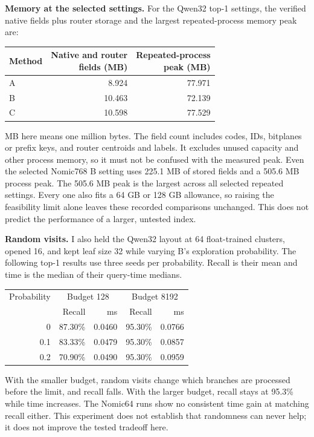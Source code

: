 \textbf{Memory at the selected settings.}
For the Qwen32 top-1 settings, the verified native fields plus router storage and the largest repeated-process memory peak are:

\begin{center}\small
\begin{tabular}{@{}lrr@{}}\toprule
Method & \shortstack{Native and router\\fields (MB)} & \shortstack{Repeated-process\\peak (MB)}\\\midrule
A & 8.924 & 77.971\\
B & 10.463 & 72.139\\
C & 10.598 & 77.529\\\bottomrule
\end{tabular}
\end{center}
MB here means one million bytes. The field count includes codes, IDs, bitplanes or prefix keys, and router centroids and labels. It excludes unused capacity and other process memory, so it must not be confused with the measured peak. Even the selected Nomic768 B setting uses 225.1 MB of stored fields and a 505.6 MB process peak. The 505.6 MB peak is the largest across all selected repeated settings. Every one also fits a 64 GB or 128 GB allowance, so raising the feasibility limit alone leaves these recorded comparisons unchanged. This does not predict the performance of a larger, untested index.

\textbf{Random visits.}
I also held the Qwen32 layout at 64 float-trained clusters, opened 16, and kept leaf size 32 while varying B's exploration probability. The following top-1 results use three seeds per probability. Recall is their mean and time is the median of their query-time medians.

\begin{center}\small
\begin{tabular}{@{}rrrrr@{}}\toprule
Probability & \multicolumn{2}{c}{Budget 128} & \multicolumn{2}{c}{Budget 8192}\\
 & Recall & ms & Recall & ms\\\midrule
0 & 87.30\% & 0.0460 & 95.30\% & 0.0766\\
0.1 & 83.33\% & 0.0479 & 95.30\% & 0.0857\\
0.2 & 70.90\% & 0.0490 & 95.30\% & 0.0959\\\bottomrule
\end{tabular}
\end{center}
With the smaller budget, random visits change which branches are processed before the limit, and recall falls. With the larger budget, recall stays at 95.3\% while time increases. The Nomic64 runs show no consistent time gain at matching recall either. This experiment does not establish that randomness can never help; it does not improve the tested tradeoff here.
